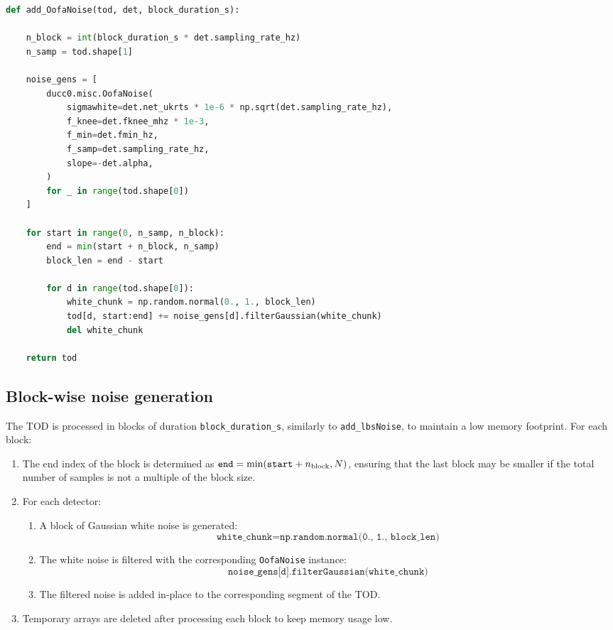 \begin{lstlisting}[language=Python,
                   caption={Implementation of the \texttt{add\_OofaNoise} function},
                   label={lst:add_OofaNoise}]
def add_OofaNoise(tod, det, block_duration_s):
    
    n_block = int(block_duration_s * det.sampling_rate_hz)
    n_samp = tod.shape[1]
   
    noise_gens = [
        ducc0.misc.OofaNoise(
            sigmawhite=det.net_ukrts * 1e-6 * np.sqrt(det.sampling_rate_hz),
            f_knee=det.fknee_mhz * 1e-3,
            f_min=det.fmin_hz,
            f_samp=det.sampling_rate_hz,
            slope=-det.alpha,
        )
        for _ in range(tod.shape[0])
    ]

    for start in range(0, n_samp, n_block):    
        end = min(start + n_block, n_samp)     
        block_len = end - start                

        for d in range(tod.shape[0]):
            white_chunk = np.random.normal(0., 1., block_len)
            tod[d, start:end] += noise_gens[d].filterGaussian(white_chunk)
            del white_chunk  

    return tod
\end{lstlisting}



\subsection{Block-wise noise generation}

The TOD is processed in blocks of duration \texttt{block\_duration\_s}, similarly to \texttt{add\_lbsNoise}, to maintain a low memory footprint. For each block:
\begin{enumerate}
    \item The end index of the block is determined as $\texttt{end} = \min(\texttt{start} + n_{\rm block}, N)$, ensuring that the last block may be smaller if the total number of samples is not a multiple of the block size.
    \item For each detector:
    \begin{enumerate}
        \item A block of Gaussian white noise is generated:
        \[
        \texttt{white\_chunk} = \texttt{np.random.normal(0., 1., block\_len)}
        \]
        \item The white noise is filtered with the corresponding \texttt{OofaNoise} instance:
        \[
        \texttt{noise\_gens[d].filterGaussian(white\_chunk)}
        \]
        \item The filtered noise is added in-place to the corresponding segment of the TOD.
    \end{enumerate}
    \item Temporary arrays are deleted after processing each block to keep memory usage low.
\end{enumerate}

